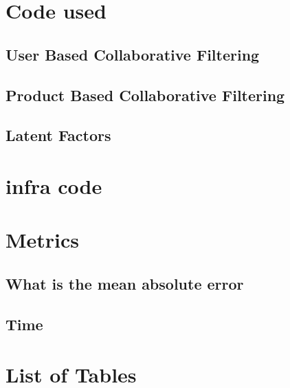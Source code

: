 \documentclass{article}
\begin{document}
\section{Code used}
\subsection{User Based Collaborative Filtering}
\subsection{Product Based Collaborative Filtering}
\subsection{Latent Factors}
\section{infra code}
\section{Metrics}
\subsection{What is the mean absolute error}
\subsection{Time}
\newpage
\listoffigures


\section{List of Tables}
\listoftables
\newpage


\end{document}
